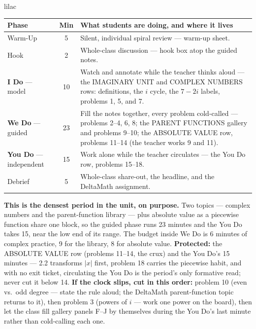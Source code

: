 \documentclass[10pt]{article}
\begin{document}
\boxguard[22]
\begin{skillbox}{lilac}
\small
\renewcommand{\arraystretch}{1.25}
\begin{tabularx}{\linewidth}{@{} l c X @{}}
\textbf{Phase} & \textbf{Min} & \textbf{What students are doing, and where it lives} \\
\midrule
Warm-Up                       & 5  & Silent, individual spiral review --- warm-up sheet. \\
Hook                          & 2  & Whole-class discussion --- hook box atop the guided notes. \\
\textbf{I Do} --- model       & 10 & Watch and annotate while the teacher thinks aloud --- the IMAGINARY UNIT and COMPLEX NUMBERS rows: definitions, the $i$ cycle, the $7 - 2i$ labels, problems 1, 5, and 7. \\
\textbf{We Do} --- guided     & 23 & Fill the notes together, every problem cold-called --- problems 2--4, 6, 8; the PARENT FUNCTIONS gallery and problems 9--10; the ABSOLUTE VALUE row, problems 11--14 (the teacher works 9 and 11). \\
\textbf{You Do} --- independent & 15 & Work alone while the teacher circulates --- the You Do row, problems 15--18. \\
Debrief                       & 5  & Whole-class share-out, the headline, and the DeltaMath assignment. \\
\end{tabularx}

\smallskip
\textbf{This is the densest period in the unit, on purpose.} Two topics --- complex numbers
and the parent-function library --- plus absolute value as a piecewise function share one
block, so the guided phase runs 23 minutes and the You Do takes 15, near the low end of its range.
The budget inside We Do is 6 minutes of complex practice, 9 for the library, 8 for absolute
value. \textbf{Protected:} the ABSOLUTE VALUE row (problems 11--14, the crux) and the You Do's
15 minutes --- 2.2 transforms $|x|$ first, problem 18 carries the piecewise habit, and with no
exit ticket, circulating the You Do is the period's only formative read; never cut it below 14.
\textbf{If the clock slips, cut in this order:} problem 10 (even vs.\ odd degree --- state
the rule aloud; the DeltaMath parent-function topic returns to it), then problem 3 (powers of
$i$ --- work one power on the board), then let the class fill gallery panels F--J by
themselves during the You Do's last minute rather than cold-calling each one.
\end{skillbox}
\end{document}

